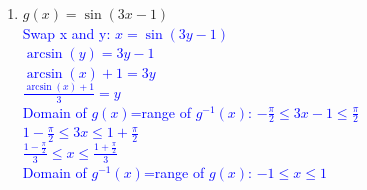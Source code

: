 \documentclass{ximera}
\begin{document}
\begin{exercise}
\begin{enumerate}
    \item $g(x)=\sin(3x-1)$\\
    \textcolor{blue}{ Swap x and y: $x=\sin(3y-1)$\\
    $\arcsin(y)=3y-1$\\
    $\arcsin(x)+1=3y$\\
    $\frac{\arcsin(x)+1}{3}=y$\\
    Domain of $g(x)$=range of $g^{-1}(x)$: $-\frac{\pi}{2}\leq 3x-1\leq \frac{\pi}{2}$\\
    $1-\frac{\pi}{2}\leq 3x\leq 1+\frac{\pi}{2}$ \\
    $\frac{1-\frac{\pi}{2}}{3}\leq x\leq  \frac{1+\frac{\pi}{2}}{3}$  \\
    Domain of $g^{-1}(x)$=range of $g(x)$: $-1\leq x \leq 1$}
    \end{enumerate}
\end{exercise}
\end{document}
